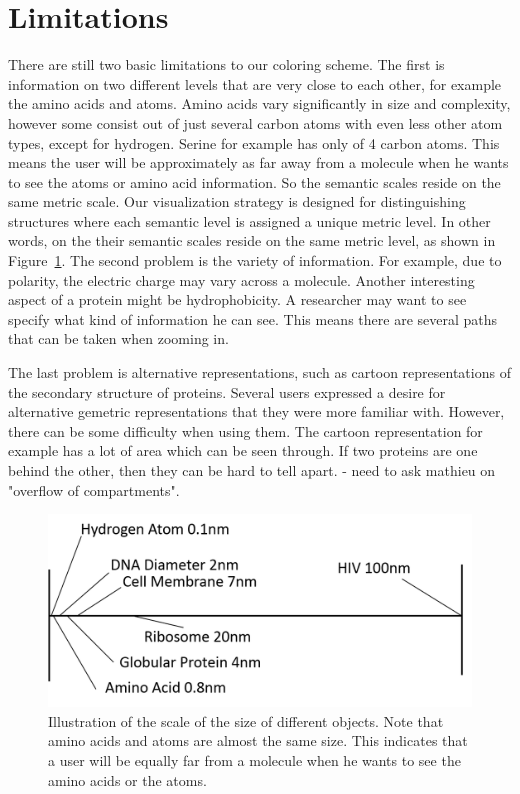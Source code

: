 \documentclass[review,journal]{vgtc}         %
\begin{document}
	\section{Limitations}
	There are still two basic limitations to our coloring scheme. 
	The first is information on two different levels that are very close to each other, for example the amino acids and atoms. 
	Amino acids vary significantly in size and complexity, however some consist out of just several carbon atoms with even less other atom types, except for hydrogen. 
	Serine for example has only of 4 carbon atoms. This means the user will be approximately as far away from a molecule when he wants to see the atoms or amino acid information. 
	So the semantic scales reside on the same metric scale.
	Our visualization strategy is designed for distinguishing structures where each semantic level is assigned a unique metric level.
	In other words, on the their semantic scales reside on the same metric level, as shown in Figure~\ref{fig:hivScale}.
	The second problem is the variety of information. 
	For example, due to polarity, the electric charge may vary across a molecule. 
	Another interesting aspect of a protein might be hydrophobicity.
	A researcher may want to see specify what kind of information he can see. 
	This means there are several paths that can be taken when zooming in.
	
	The last problem is alternative representations, such as cartoon representations of the secondary structure of proteins. 
	Several users expressed a desire for alternative gemetric representations that they were more familiar with.
	However, there can be some difficulty when using them. The cartoon representation for example has a lot of area which can be seen through. 
	If two proteins are one behind the other, then they can be hard to tell apart.
	- need to ask mathieu on "overflow of compartments".
	
	\begin{figure}
		\centering
		\includegraphics[width=1\linewidth]{Figures/hivscale}
		\caption{Illustration of the scale of the size of different objects. Note that amino acids and atoms are almost the same size. This indicates that a user will be equally far from a molecule when he wants to see the amino acids or the atoms.}
		\label{fig:hivScale}
	\end{figure}
	
\end{document}
